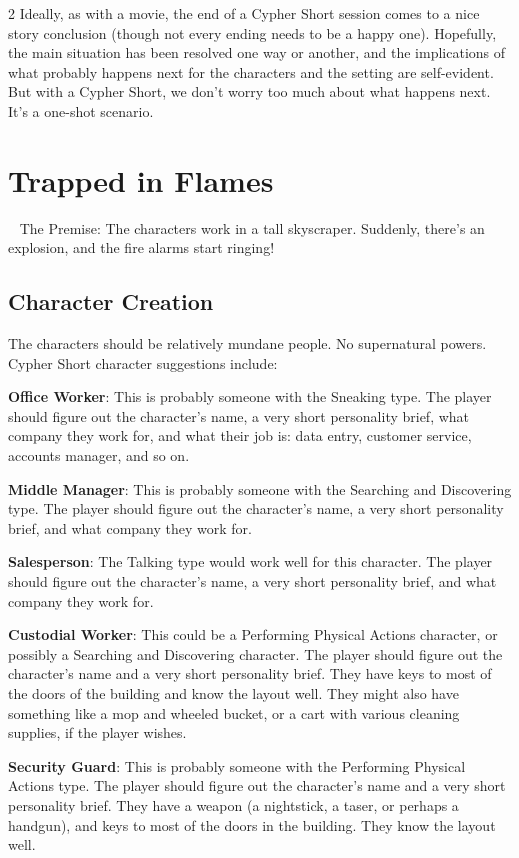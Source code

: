 \begin{multicols}{2}
Ideally, as with a movie, the end of a Cypher Short session comes to a nice story conclusion (though not every ending needs to be a happy one). Hopefully, the main situation has been resolved one way or another, and the implications of what probably happens next for the characters and the setting are self-evident. But with a Cypher Short, we don’t worry too much about what happens next. It’s a one-shot scenario.

\section{Trapped in Flames}
 
The Premise: The characters work in a tall skyscraper. Suddenly, there’s an explosion, and the fire alarms start ringing!

\subsection{Character Creation}

The characters should be relatively mundane people. No supernatural powers. Cypher Short character suggestions include:

\textbf{Office Worker}: This is probably someone with the Sneaking type. The player should figure out the character’s name, a very short personality brief, what company they work for, and what their job is: data entry, customer service, accounts manager, and so on.

\textbf{Middle Manager}: This is probably someone with the Searching and Discovering type. The player should figure out the character’s name, a very short personality brief, and what company they work for.

\textbf{Salesperson}: The Talking type would work well for this character. The player should figure out the character’s name, a very short personality brief, and what company they work for.

\textbf{Custodial Worker}: This could be a Performing Physical Actions character, or possibly a Searching and Discovering character. The player should figure out the character’s name and a very short personality brief. They have keys to most of the doors of the building and know the layout well. They might also have something like a mop and wheeled bucket, or a cart with various cleaning supplies, if the player wishes.

\textbf{Security Guard}: This is probably someone with the Performing Physical Actions type. The player should figure out the character’s name and a very short personality brief. They have a weapon (a nightstick, a taser, or perhaps a handgun), and keys to most of the doors in the building. They know the layout well.


\end{multicols}
